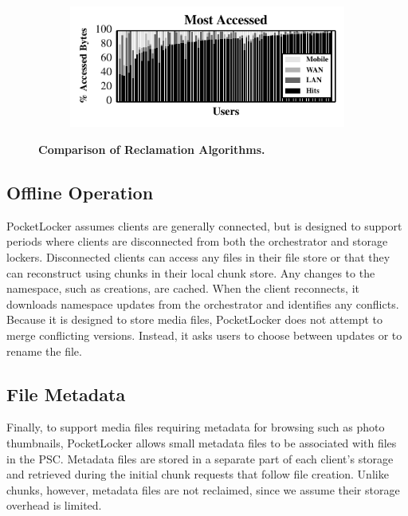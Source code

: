 \begin{figure}[t]
\begin{subfigure}[t]{0.95\columnwidth}
  \end{subfigure}\\
  \begin{subfigure}[t]{0.95\columnwidth}

    \includegraphics[width=\columnwidth]{./figures/pocketlocker/AccessSimulatorPerformanceGraph.pdf}

  \end{subfigure}

  \caption{\small \textbf{Comparison of Reclamation Algorithms.}}

  \label{fig-simulation-policy}
  
  \vspace*{-0.2in}
\end{figure}

\subsection{Offline Operation}

PocketLocker assumes clients are generally connected, but is designed to
support periods where clients are disconnected from both the orchestrator and
storage lockers.  Disconnected clients can access any files in their file store
or that they can reconstruct using chunks in their local chunk store. Any
changes to the namespace, such as creations, are cached.  When the client
reconnects, it downloads namespace updates from the orchestrator and identifies
any conflicts. Because it is designed to store media files, PocketLocker does
not attempt to merge conflicting versions. Instead, it asks users to choose
between updates or to rename the file.

\subsection{File Metadata}

Finally, to support media files requiring metadata for browsing such
as photo thumbnails, PocketLocker allows small metadata files to
be associated with files in the PSC. Metadata files are stored in a
separate part of each client's storage and retrieved during the initial chunk
requests that follow file creation. Unlike chunks, however, metadata files
are not reclaimed, since we assume their storage overhead is limited.
